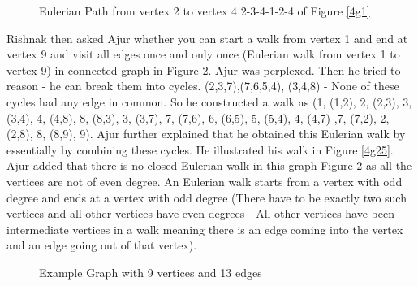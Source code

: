 \begin{figure}
\begin{center}
\caption{ Eulerian Path from vertex 2 to vertex 4 2-3-4-1-2-4 of Figure \ref{4g1}}\label{4g15}
\end{center}
\end{figure}
\vspace{2cm}
Rishnak then asked Ajur whether you can start a walk from vertex 1 and end at vertex 9 and visit all edges once and only once (Eulerian walk from vertex 1 to vertex 9) in connected graph in Figure \ref{4g2}.
Ajur was perplexed. Then he tried to reason - he can break them into cycles. (2,3,7),(7,6,5,4), (3,4,8)  - None of these cycles had any edge in common. So he constructed a walk as (1, (1,2), 2, (2,3),
3, (3,4), 4, (4,8), 8, (8,3), 3, (3,7), 7, (7,6), 6, (6,5), 5, (5,4), 4, (4,7) ,7,
(7,2), 2, (2,8), 8, (8,9), 9). Ajur further explained that he obtained this Eulerian walk by essentially by combining these cycles. He illustrated his walk in Figure \ref{4g25}. Ajur added that there is no closed Eulerian walk in this graph Figure \ref{4g2} as all the vertices are not of even degree. An Eulerian walk starts from a vertex with odd degree and ends at a vertex with odd degree (There have to be exactly two such vertices and all other vertices have even degrees - All other vertices have been intermediate vertices in a walk meaning there is an edge coming into the vertex and an edge going out of that vertex).

\begin{figure}
\begin{center}
\caption{ Example Graph with 9 vertices and 13 edges}\label{4g2}
\end{center}
\end{figure}

